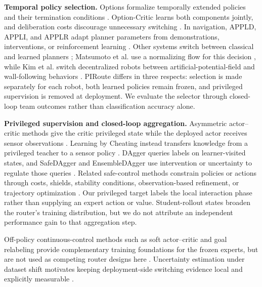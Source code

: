 \documentclass[letterpaper,10pt,conference]{ieeeconf}
\newcommand{\method}{PIRoute}
\begin{document}
\textbf{Temporal policy selection.} Options formalize temporally extended policies and their termination conditions \cite{sutton1999options}. Option-Critic learns both components jointly, and deliberation costs discourage unnecessary switching \cite{bacon2017option,harb2018deliberation}. In navigation, APPLD, APPLI, and APPLR adapt planner parameters from demonstrations, interventions, or reinforcement learning \cite{xiao2020appld,wang2021appli,xu2021applr}. Other systems switch between classical and learned planners \cite{kastner2022allinone,dey2023trust}; Matsumoto et al. use a normalizing flow for this decision \cite{matsumoto2024flow}, while Kim et al. switch decentralized robots between artificial-potential-field and wall-following behaviors \cite{Kim_2025}. \method{} differs in three respects: selection is made separately for each robot, both learned policies remain frozen, and privileged supervision is removed at deployment. We evaluate the selector through closed-loop team outcomes rather than classification accuracy alone.

\textbf{Privileged supervision and closed-loop aggregation.} Asymmetric actor--critic methods give the critic privileged state while the deployed actor receives sensor observations \cite{pinto2018asymmetric}. Learning by Cheating instead transfers knowledge from a privileged teacher to a sensor policy \cite{chen2020cheating}. DAgger queries labels on learner-visited states, and SafeDAgger and EnsembleDAgger use intervention or uncertainty to regulate those queries \cite{ross2011dagger,zhang2017safedagger,menda2019ensemble}. Related safe-control methods constrain policies or actions through costs, shields, stability conditions, observation-based refinement, or trajectory optimization \cite{achiam2017cpo,alshiekh2018shielding,berkenkamp2017safe,dalal2018safe,Cui_2022,brunke2022safe}. Our privileged target labels the local interaction phase rather than supplying an expert action or value. Student-rollout states broaden the router's training distribution, but we do not attribute an independent performance gain to that aggregation step.

Off-policy continuous-control methods such as soft actor--critic and goal relabeling provide complementary training foundations for the frozen experts, but are not used as competing router designs here \cite{haarnoja2018sac,andrychowicz2017her}. Uncertainty estimation under dataset shift motivates keeping deployment-side switching evidence local and explicitly measurable \cite{ovadia2019trust}.
\end{document}
